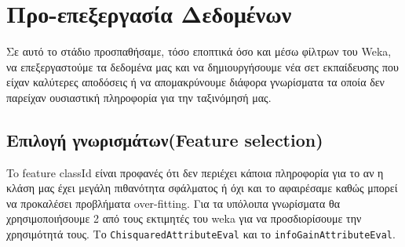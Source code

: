 \chapter{Προ-επεξεργασία Δεδομένων}
Σε αυτό το στάδιο προσπαθήσαμε,
τόσο εποπτικά όσο και μέσω φίλτρων του Weka,
να επεξεργαστούμε τα δεδομένα μας και να δημιουργήσουμε νέα σετ εκπαίδευσης που είχαν καλύτερες αποδόσεις ή να απομακρύνουμε διάφορα γνωρίσματα τα οποία δεν παρείχαν ουσιαστική πληροφορία για την ταξινόμησή μας.

\section {Επιλογή γνωρισμάτων(Feature selection) }
To feature classId είναι προφανές ότι δεν περιέχει κάποια πληροφορία για το αν η κλάση μας έχει μεγάλη πιθανότητα σφάλματος ή όχι
και το αφαιρέσαμε καθώς μπορεί να προκαλέσει προβλήματα over-fitting.
Για τα υπόλοιπα γνωρίσματα θα χρησιμοποιήσουμε 2 από τους εκτιμητές του weka για να προσδιορίσουμε την χρησιμότητά τους.
Το
\lstinline[language=Java]!ChisquaredAttributeEval!
και το
\lstinline[language=Java]!infoGainAttributeΕval!.


